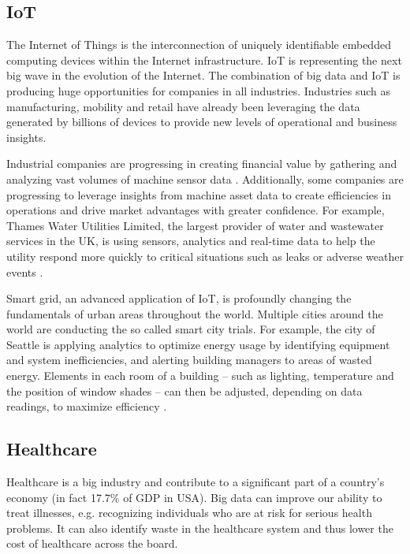 \documentclass[11pt]{book}
\begin{document}
\subsection{IoT}
The Internet of Things is the interconnection of uniquely identifiable embedded computing devices within the Internet infrastructure. IoT is representing the next big wave in the evolution of the Internet. The combination of big data and IoT is producing huge opportunities for companies in all industries. Industries such as manufacturing, mobility and retail have already been leveraging the data generated by billions of devices to provide new levels of operational and business insights. 

Industrial companies are progressing in creating financial value by gathering and analyzing vast volumes of machine sensor data \cite{IndustrialInternetReport2014}. Additionally, some companies are progressing to leverage insights from machine asset data to create efficiencies in operations and drive market advantages with greater confidence. For example, Thames Water Utilities Limited, the largest provider of water and wastewater services in the UK, is using sensors, analytics and real-time data to help the utility respond more quickly to critical situations such as leaks or adverse weather events \cite{Accenture14SmartGrid}.

Smart grid, an advanced application of IoT, is profoundly changing the fundamentals of urban areas throughout the world. Multiple cities around the world are conducting the so called smart city trials. For example, the city of Seattle is applying analytics to optimize energy usage by identifying equipment and system inefficiencies, and alerting building managers to areas of wasted energy. Elements in each room of a building -- such as lighting, temperature and the position of window shades -- can then be adjusted, depending on data readings, to maximize efficiency \cite{Accenture13Seattle}.

\subsection{Healthcare}
Healthcare is a big industry and contribute to a significant part of a country's economy (in fact 17.7\% of GDP in USA). Big data can improve our ability to treat illnesses, e.g. recognizing individuals who are at risk for serious health problems. It can also identify waste in the healthcare system and thus lower the cost of healthcare across the board.
\end{document}
